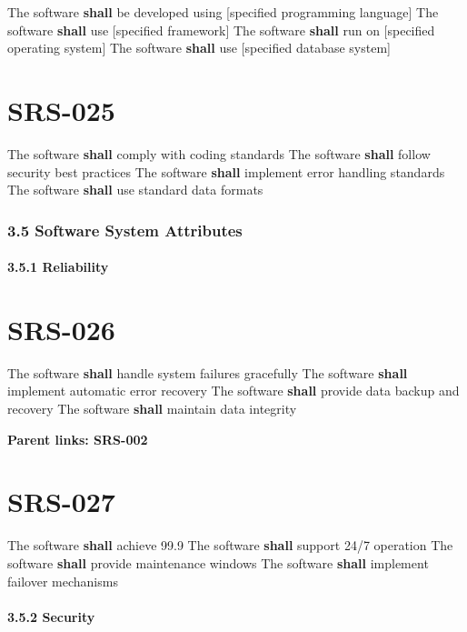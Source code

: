 The software \textbf{shall} be developed using [specified programming language]
The software \textbf{shall} use [specified framework]
The software \textbf{shall} run on [specified operating system]
The software \textbf{shall} use [specified database system]

\section{SRS-025}\label{SRS-025}

The software \textbf{shall} comply with coding standards
The software \textbf{shall} follow security best practices
The software \textbf{shall} implement error handling standards
The software \textbf{shall} use standard data formats

\subsubsection{3.5 Software System Attributes}

\paragraph{3.5.1 Reliability}

\section{SRS-026}\label{SRS-026}

The software \textbf{shall} handle system failures gracefully
The software \textbf{shall} implement automatic error recovery
The software \textbf{shall} provide data backup and recovery
The software \textbf{shall} maintain data integrity

\textbf{Parent links: SRS-002}

\section{SRS-027}\label{SRS-027}

The software \textbf{shall} achieve 99.9%
The software \textbf{shall} support 24/7 operation
The software \textbf{shall} provide maintenance windows
The software \textbf{shall} implement failover mechanisms

\paragraph{3.5.2 Security}

